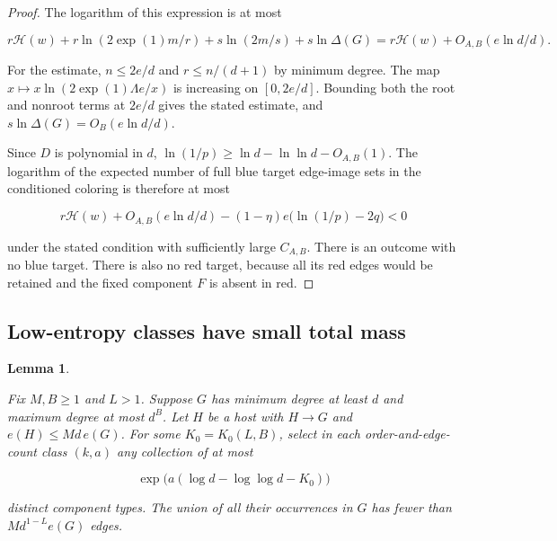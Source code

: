 \documentclass[11pt]{amsart}
\newtheorem{lemma}[theorem]{Lemma}
\theoremstyle{definition}
\theoremstyle{remark}
\numberwithin{equation}{section}
\begin{document}
\begin{proof}
The logarithm of this expression is at most

\begin{equation}
r\mathcal H(w)+r\ln(2\exp(1)m/r)+s\ln(2m/s)+s\ln\Delta(G)
 =r\mathcal H(w)+O_{A,B}(e\ln d/d).
\end{equation}

For the estimate, $n\le2e/d $ and $ r\le n/(d+1)$ by minimum degree. The map $ x\mapsto x\ln(2\exp(1)\Lambda e/x)$ is increasing on $[0,2e/d]$. Bounding both the root and nonroot terms at $2e/d $ gives the stated estimate, and $ s\ln\Delta(G)=O_B(e\ln d/d)$.

Since $D $ is polynomial in $ d $, $\ln(1/p)\ge\ln d-\ln\ln d-O_{A,B}(1)$. The logarithm of the expected number of full blue target edge-image sets in the conditioned coloring is therefore at most

\begin{equation}
r\mathcal H(w)+O_{A,B}(e\ln d/d)
 -(1-\eta)e\bigl(\ln(1/p)-2q\bigr)<0
\end{equation}

under the stated condition with sufficiently large $C_{A,B}$. There is an outcome with no blue target. There is also no red target, because all its red edges would be retained and the fixed component $ F$ is absent in red.

\end{proof}

\subsection{Low-entropy classes have small total mass}

\begin{lemma}\label{lem:class-mass}

Fix $M,B\ge1$ and $ L>1$. Suppose $ G $ has minimum degree at least $ d $ and maximum degree at most $ d^B $. Let $H$ be a host with $H\to G$ and $e(H)\le Md\,e(G)$. For some $ K_0=K_0(L,B)$, select in each order-and-edge-count class $(k,a)$ any collection of at most

\begin{equation}
\exp\bigl(a(\log d-\log\log d-K_0)\bigr)
\end{equation}

distinct component types. The union of all their occurrences in $G $ has fewer than $ Md^{1-L}e(G)$ edges.

\end{lemma}
\end{document}
